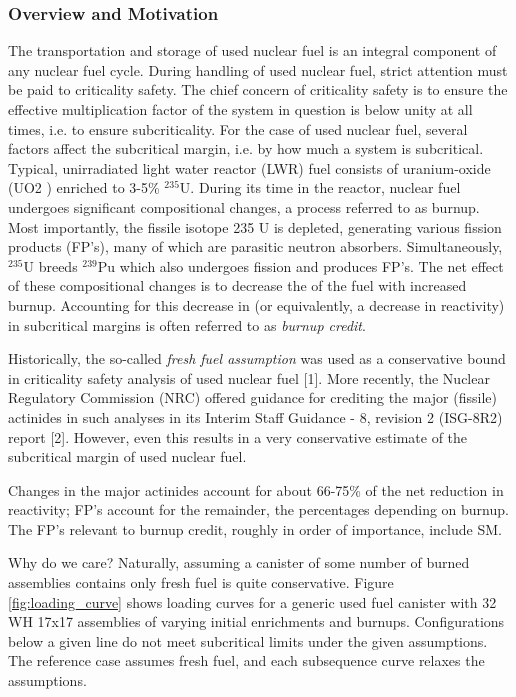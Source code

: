 \subsubsection*{Overview and Motivation}

The transportation and storage of used nuclear fuel is an integral component of any
nuclear fuel cycle. During handling of used nuclear fuel, strict attention must be paid
to criticality safety. The chief concern of criticality safety is to ensure the effective
multiplication factor \keff of the system in question is below unity at all times, i.e. to
ensure subcriticality.
For the case of used nuclear fuel, several factors affect the subcritical margin, i.e.
by how much a system is subcritical. Typical, unirradiated light water reactor (LWR)
fuel consists of uranium-oxide (UO2 ) enriched to 3-5\% ${}^{235}$U. During its time in the
reactor, nuclear fuel undergoes significant compositional changes, a process referred
to as burnup. Most importantly, the fissile isotope 235 U is depleted, generating various
fission products (FP's), many of which are parasitic neutron absorbers. Simultaneously,
${}^{235}$U breeds ${}^{239}$Pu which also undergoes fission and produces FP's. The net
effect of these compositional changes is to decrease the \keff of the fuel with increased
burnup. Accounting for this decrease in \keff (or equivalently, a decrease in reactivity)
in subcritical margins is often referred to as \textit{burnup credit}.

Historically, the so-called \textit{fresh fuel assumption} was used as a conservative bound
in criticality safety analysis of used nuclear fuel [1]. More recently, the Nuclear
Regulatory Commission (NRC) offered guidance for crediting the major (fissile) actinides
in such analyses in its Interim Staff Guidance - 8, revision 2 (ISG-8R2) report [2]. However,
even this results in a very conservative estimate of the subcritical margin of used
nuclear fuel.

Changes in the major actinides account for about 66-75\% of the net reduction
in reactivity; FP's account for the remainder, the percentages depending on burnup.
The FP's relevant to burnup credit, roughly in order of importance, include SM.
 
Why do we care?  Naturally, assuming a canister of some number of burned assemblies 
contains only fresh fuel is quite conservative.  Figure \ref{fig:loading_curve} shows 
loading curves for a generic used fuel canister with 32 WH 17x17 assemblies of varying 
initial enrichments and burnups.  Configurations below a given line do not meet subcritical 
limits under the given assumptions.  The reference case assumes fresh fuel, and each 
subsequence curve relaxes the assumptions.  

